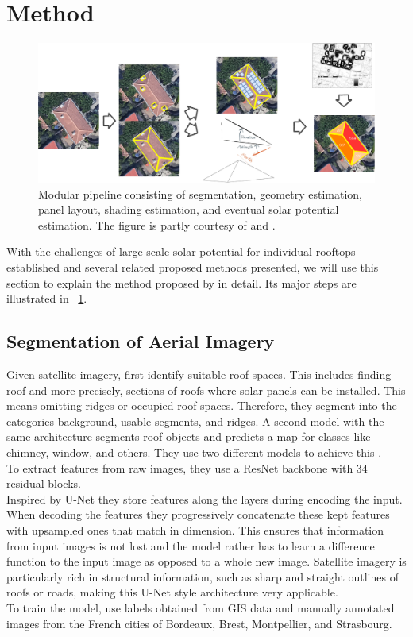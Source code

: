 \documentclass{article} %
\newcommand{\figref}[1]{\figurename~\ref{#1}}
\begin{document}
\section*{Method}
\begin{figure}
	\centering
	\includegraphics[width=\linewidth]{../figures/5_solar_potential.pdf}
	\caption{Modular pipeline consisting of segmentation, geometry estimation, panel layout, shading estimation, and eventual solar potential estimation. The figure is partly courtesy of \citet{gearth} and \citet{zakvsek2011sky}.}
	\label{fig:arch}
\end{figure}
With the challenges of large-scale solar potential for individual rooftops established and several related proposed methods presented, we will use this section to explain the method proposed by \citet*{de2021predicting} in detail. Its major steps are illustrated in \figref{fig:arch}.\\
\subsection*{Segmentation of Aerial Imagery}
Given satellite imagery, \citet{de2021predicting} first identify suitable roof spaces. This includes finding roof and more precisely, sections of roofs where solar panels can be installed. This means omitting ridges or occupied roof spaces. Therefore, they segment into the categories background, usable segments, and ridges. A second model with the same architecture segments roof objects and predicts a map for classes like chimney, window, and others. They use two different models to achieve this \cite{de2021predicting}.\\
To extract features from raw images, they use a ResNet backbone \cite{he2016deep} with 34 residual blocks.\\
Inspired by U-Net \cite{ronneberger2015u} they store features along the layers during encoding the input. When decoding the features they progressively concatenate these kept features with upsampled ones that match in dimension. This ensures that information from input images is not lost and the model rather has to learn a difference function to the input image as opposed to a whole new image. Satellite imagery is particularly rich in structural information, such as sharp and straight outlines of roofs or roads, making this U-Net style architecture very applicable.\\
To train the model, \citet{de2021predicting} use labels obtained from GIS data and manually annotated images from the French cities of Bordeaux, Brest, Montpellier, and Strasbourg.
\end{document}
